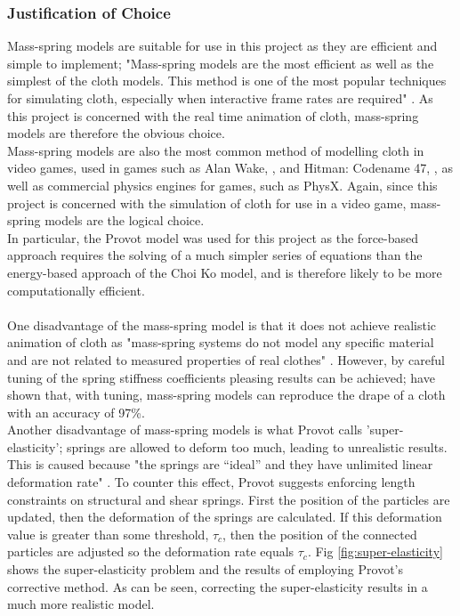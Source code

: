 \subsubsection{Justification of Choice}
Mass-spring models are suitable for use in this project as they are efficient and simple to implement; "Mass-spring models are the most efficient as well as the simplest of the cloth models.  This method is one of the most popular techniques for simulating cloth, especially when interactive frame rates are required" \parencite[2]{Zink2007}. As this project is concerned with the real time animation of cloth, mass-spring models are therefore the obvious choice.
\\Mass-spring models are also the most common method of modelling cloth in video games, used in games such as Alan Wake, \parencite{Enqvist2010}, and Hitman: Codename 47, \parencite{Jakobsen2005}, as well as commercial physics engines for games, such as PhysX. Again, since this project is concerned with the simulation of cloth for use in a video game, mass-spring models are the logical choice.
\\In particular, the Provot model was used for this project as the force-based approach requires the solving of a much simpler series of equations than the energy-based approach of the Choi Ko model, and is therefore likely to be more computationally efficient.
\\\\One disadvantage of the mass-spring model is that it does not achieve realistic animation of cloth as "mass-spring systems do not model any specific material and are not related to measured properties of real clothes" \parencite[3]{Wacker2005a}. However, by careful tuning of the spring stiffness coefficients pleasing results can be achieved; \textcite{Mongus2012} have shown that, with tuning, mass-spring models can reproduce the drape of a cloth with an accuracy of 97\%.
\\Another disadvantage of mass-spring models is what Provot calls 'super-elasticity'; springs are allowed to deform too much, leading to unrealistic results. This is caused because "the springs are “ideal” and they have unlimited linear deformation rate" \parencite[3]{Vassilev2001}. To counter this effect, Provot suggests enforcing length constraints on structural and shear springs. First the position of the particles are updated, then the deformation of the springs are calculated. If this deformation value is greater than some threshold, $\tau_{c}$, then the position of the connected particles are adjusted so the deformation rate equals $\tau_{c}$. Fig \ref{fig:super-elasticity} shows the super-elasticity problem and the results of employing Provot's corrective method. As can be seen, correcting the super-elasticity results in a much more realistic model.

